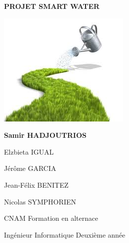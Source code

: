 \begin{titlepage}
\color[RGB]{91, 155, 213}
\parindent=0pt

\hrulefill
\begin{center}\bfseries\Huge
PROJET SMART WATER
\end{center}
\hrulefill


\begin{center}
\includegraphics[scale=1.0]{images/arrosage.jpg}%
\end{center}

\vspace*{1cm}
\begin{center}\bfseries\Large
Samir HADJOUTRIOS

Elzbieta IGUAL

Jérôme GARCIA

Jean-Félix BENITEZ

Nicolas SYMPHORIEN
\end{center}


CNAM  Formation en alternace

Ingénieur Informatique  Deuxième année

\end{titlepage}

